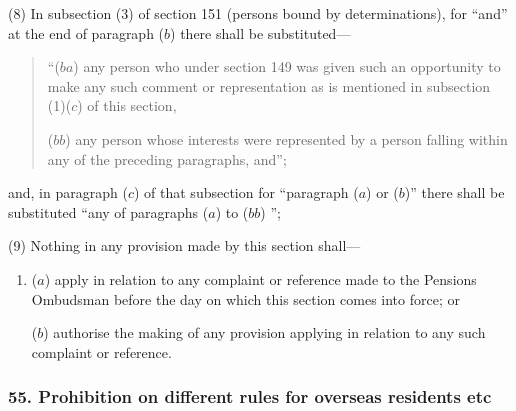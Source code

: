 \documentclass[12pt,a4paper]{article}
\begin{document}
(8) In subsection (3)  of section 151 (persons bound by determinations), for “and” at the end of paragraph ($b$)  there shall be substituted—
\begin{quotation}
“($ba$) any person who under section 149 was given such an opportunity to make any such comment or representation as is mentioned in subsection (1)($c$)  of this section,

($bb$) any person whose interests were represented by a person falling within any of the preceding paragraphs, and”;
\end{quotation}
and, in paragraph ($c$)  of that subsection for “paragraph ($a$)  or ($b$)” there shall be substituted “any of paragraphs ($a$)  to ($bb$) ”;

(9) Nothing in any provision made by this section shall—
\begin{enumerate}\item[]
($a$) apply in relation to any complaint or reference made to the Pensions Ombudsman before the day on which this section comes into force; or

($b$) authorise the making of any provision applying in relation to any such complaint or reference.
\end{enumerate}


\subsubsection{55. Prohibition on different rules for overseas residents etc}
\end{document}
